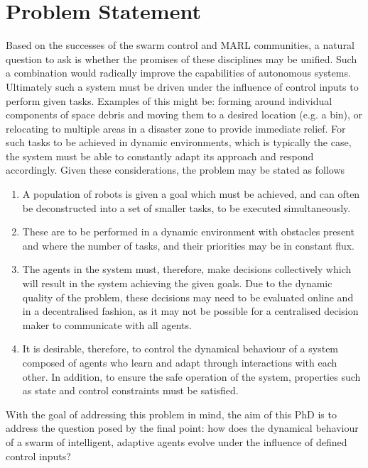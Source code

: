 \documentclass[.../main.tex]{subfiles}
\begin{document}
    \section{Problem Statement} \label{sec::Problem_Statement}

    Based on the successes of the swarm control and MARL communities,
    a natural question to ask is whether the promises of these
    disciplines may be unified. Such a combination would radically
    improve the capabilities of autonomous systems. Ultimately such a
    system must be driven under the influence of control inputs to
    perform given tasks. Examples of this might be: forming around
    individual components of space debris and moving them to a desired
    location (e.g. a bin), or relocating to multiple areas in a
    disaster zone to provide immediate relief. For such tasks to be
    achieved in dynamic environments, which is typically the case, the
    system must be able to constantly adapt its approach and respond
    accordingly. Given these considerations, the problem may be stated
    as follows

    \begin{enumerate}
    	\item A population of robots is given a goal which must be achieved, and can often be
    	deconstructed into a set of smaller tasks, to be executed simultaneously. 
    	\item These are to be performed in a dynamic environment with obstacles present and where
    	the number of tasks, and their priorities may be in constant flux.
    	\item The agents in the system must, therefore, make decisions collectively which will result
        in the system achieving the given goals. Due to the dynamic quality of the problem, these
        decisions may need to be evaluated online and in a decentralised fashion, as it may not be
        possible for a centralised decision maker to communicate with all agents. 
        \item It is desirable, therefore, to control the dynamical behaviour of
    	a system composed of agents who learn and adapt through interactions with each other. In
    	addition, to ensure the safe operation of the system, properties such as state and control
    	constraints must be satisfied.
    \end{enumerate}


    With the goal of addressing this problem in mind, the aim of this PhD is to address the question
    posed by the final point: how does the dynamical behaviour of a swarm of intelligent, adaptive
    agents evolve under the influence of defined control inputs?
\end{document}
